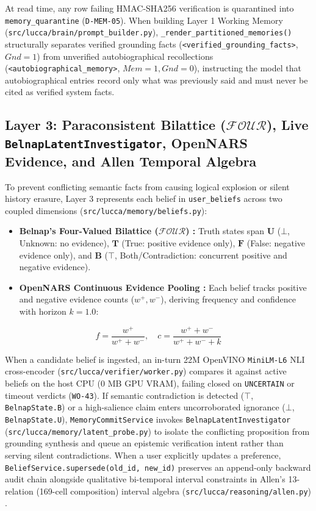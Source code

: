 \documentclass[11pt,a4paper]{article}
\begin{document}
At read time, any row failing HMAC-SHA256 verification is quarantined into \texttt{memory\_quarantine} (\texttt{D-MEM-05}). When building Layer 1 Working Memory (\texttt{src/lucca/brain/prompt\_builder.py}), \texttt{\_render\_partitioned\_memories()} structurally separates verified grounding facts (\texttt{<verified\_grounding\_facts>}, $Gnd=1$) from unverified autobiographical recollections (\texttt{<autobiographical\_memory>}, $Mem=1, Gnd=0$), instructing the model that autobiographical entries record only what was previously said and must never be cited as verified system facts.

\subsection{Layer 3: Paraconsistent Bilattice ($\mathcal{FOUR}$), Live \texttt{BelnapLatentInvestigator}, OpenNARS Evidence, and Allen Temporal Algebra}
To prevent conflicting semantic facts from causing logical explosion or silent history erasure, Layer 3 represents each belief in \texttt{user\_beliefs} across two coupled dimensions (\texttt{src/lucca/memory/beliefs.py}):
\begin{itemize}
    \item \textbf{Belnap's Four-Valued Bilattice ($\mathcal{FOUR}$) \cite{belnap1977}:} Truth states span $\mathbf{U}$ ($\bot$, Unknown: no evidence), $\mathbf{T}$ (True: positive evidence only), $\mathbf{F}$ (False: negative evidence only), and $\mathbf{B}$ ($\top$, Both/Contradiction: concurrent positive and negative evidence).
    \item \textbf{OpenNARS Continuous Evidence Pooling \cite{wang2013}:} Each belief tracks positive and negative evidence counts ($w^+, w^-$), deriving frequency and confidence with horizon $k = 1.0$:
\end{itemize}
\begin{equation}
f = \frac{w^+}{w^+ + w^-}, \quad c = \frac{w^+ + w^-}{w^+ + w^- + k}
\end{equation}

When a candidate belief is ingested, an in-turn 22M OpenVINO \texttt{MiniLM-L6} NLI cross-encoder (\texttt{src/lucca/verifier/worker.py}) compares it against active beliefs on the host CPU (0 MB GPU VRAM), failing closed on \texttt{UNCERTAIN} or timeout verdicts (\texttt{WO-43}). If semantic contradiction is detected ($\top$, \texttt{BelnapState.B}) or a high-salience claim enters uncorroborated ignorance ($\bot$, \texttt{BelnapState.U}), \texttt{MemoryCommitService} invokes \texttt{BelnapLatentInvestigator} (\texttt{src/lucca/memory/latent\_probe.py}) to isolate the conflicting proposition from grounding synthesis and queue an epistemic verification intent rather than serving silent contradictions. When a user explicitly updates a preference, \texttt{BeliefService.supersede(old\_id, new\_id)} preserves an append-only backward audit chain alongside qualitative bi-temporal interval constraints in Allen's 13-relation (169-cell composition) interval algebra (\texttt{src/lucca/reasoning/allen.py}) \cite{allen1983}.
\end{document}
